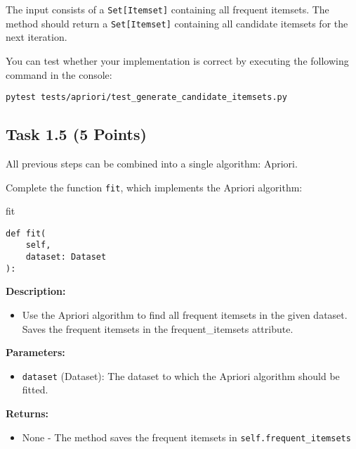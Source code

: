 \documentclass[
english,
smallborders
]{i6prcsht}
\newcommand{\points}[1]{\hfill \color{red}(#1 Points)\color{black}}
\begin{document}
\vspace*{0.5cm}

The input consists of a \texttt{Set[Itemset]} containing all frequent itemsets. The method should return a \texttt{Set[Itemset]} containing all candidate itemsets for the next iteration.

You can test whether your implementation is correct by executing the following command in the console:

\vspace*{0.3cm}

\begin{lstlisting}
pytest tests/apriori/test_generate_candidate_itemsets.py
\end{lstlisting}

\newpage

\subsection*{Task 1.5 \points{5}}

All previous steps can be combined into a single algorithm: Apriori.

Complete the function \texttt{fit}, which implements the Apriori algorithm:

\vspace*{0.3cm}

\begin{functionbox}{fit}
	\begin{lstlisting}[numbers=none]
def fit(
    self, 
    dataset: Dataset
):
\end{lstlisting}
	
	\textbf{Description:}
	\begin{itemize}[leftmargin=*,topsep=0pt]
		\item Use the Apriori algorithm to find all frequent itemsets in the given dataset. Saves the frequent itemsets in the frequent\_itemsets attribute.
	\end{itemize}
	
	\textbf{Parameters:}
	\begin{itemize}[leftmargin=*,topsep=0pt]
		\item \texttt{dataset} (Dataset): The dataset to which the Apriori algorithm should be fitted.
	\end{itemize}
	
	\textbf{Returns:}
	\begin{itemize}[leftmargin=*,topsep=0pt]
		\item None - The method saves the frequent itemsets in \texttt{self.frequent\_itemsets}
	\end{itemize}
\end{functionbox}
\end{document}
